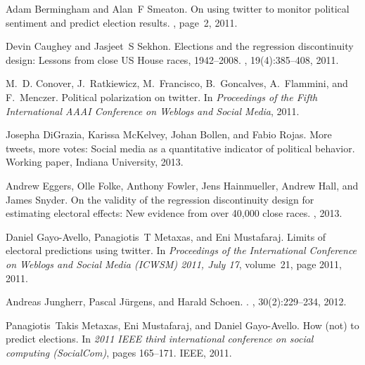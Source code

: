 \documentclass{sig-alternate-2013}
\begin{document}
% 
% 
\begin{thebibliography}{10}

Adam Bermingham and Alan~F Smeaton.
\newblock On using twitter to monitor political sentiment and predict election
  results.
, page~2,
  2011.

Devin Caughey and Jasjeet~S Sekhon.
\newblock Elections and the regression discontinuity design: Lessons from close
  {US House} races, 1942--2008.
, 19(4):385--408, 2011.

M.~D. Conover, J.~Ratkiewicz, M.~Francisco, B.~Goncalves, A.~Flammini, and
  F.~Menczer.
\newblock Political polarization on twitter.
\newblock In {\em Proceedings of the Fifth International AAAI Conference on
  Weblogs and Social Media}, 2011.

Josepha DiGrazia, Karissa McKelvey, Johan Bollen, and Fabio Rojas.
\newblock More tweets, more votes: Social media as a quantitative indicator of
  political behavior.
\newblock Working paper, Indiana University, 2013.

Andrew Eggers, Olle Folke, Anthony Fowler, Jens Hainmueller, Andrew Hall, and
  James Snyder.
\newblock On the validity of the regression discontinuity design for estimating
  electoral effects: New evidence from over 40,000 close races.
, 2013.

Daniel Gayo-Avello, Panagiotis~T Metaxas, and Eni Mustafaraj.
\newblock Limits of electoral predictions using twitter.
\newblock In {\em Proceedings of the International Conference on Weblogs and
  Social Media (ICWSM) 2011, July 17}, volume~21, page 2011, 2011.

Andreas Jungherr, Pascal J{\"u}rgens, and Harald Schoen.
.
, 30(2):229--234, 2012.

Panagiotis~Takis Metaxas, Eni Mustafaraj, and Daniel Gayo-Avello.
\newblock How (not) to predict elections.
\newblock In {\em 2011 IEEE third international conference on social computing
  (SocialCom)}, pages 165--171. IEEE, 2011.


\end{thebibliography}
\end{document}
